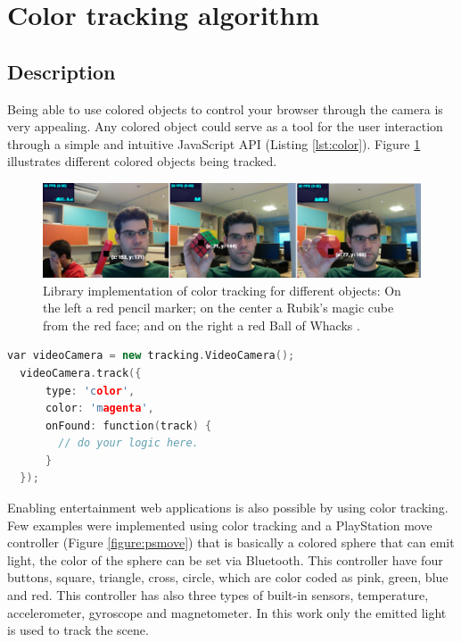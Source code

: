 

\section{Color tracking algorithm} %
\label{sec:evaluation:color_tracking_algorithm}

\subsection{Description} %
\label{sub:evaluation:results:color_tracking_algorithm:description}

Being able to use colored objects to control your browser through the camera is very appealing. Any colored object could serve as a tool for the user interaction through a simple and intuitive JavaScript API (Listing \ref{lst:color}). Figure \ref{figure:color_object} illustrates different colored objects being tracked.

\begin{figure}[!htb]
  \centering
  \includegraphics[width=\linewidth]{chapters/evaluation/color_object.png}
  \caption{Library implementation of color tracking for different objects: On the left a red pencil marker; on the center a Rubik's magic cube \cite{Rubiks2013} from the red face; and on the right a red Ball of Whacks \cite{Whack2013}.}
  \label{figure:color_object}
\end{figure}

\newpage

\begin{lstlisting}[language=C++,label={lst:color},caption=Example of \textit{tracking.js} color API.]
  var videoCamera = new tracking.VideoCamera();
  videoCamera.track({
      type: 'color',
      color: 'magenta',
      onFound: function(track) {
        // do your logic here.
      }
  });
\end{lstlisting}

Enabling entertainment web applications is also possible by using color tracking. Few examples were implemented using color tracking and a PlayStation move controller (Figure \ref{figure:psmove}) that is basically a colored sphere that can emit light, the color of the sphere can be set via Bluetooth. This controller have four buttons, square, triangle, cross, circle, which are color coded as pink, green, blue and red. This controller has also three types of built-in sensors, temperature, accelerometer, gyroscope and magnetometer. In this work only the emitted light is used to track the scene.

